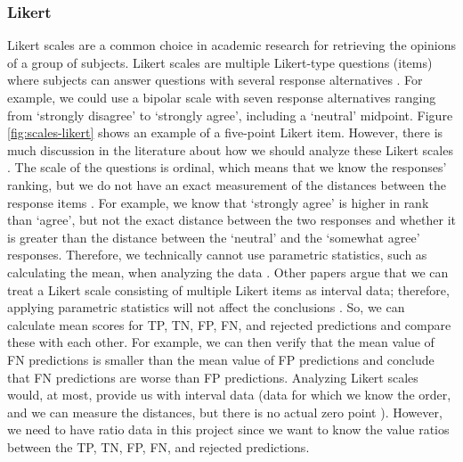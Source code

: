 \subsubsection{Likert}
\label{sec:likert}
Likert scales are a common choice in academic research for retrieving the opinions of a group of subjects.
%
Likert scales are multiple Likert-type questions (items) where subjects can answer questions with several response alternatives \citep{boone2012analyzing}.
%
For example, we could use a bipolar scale with seven response alternatives ranging from `strongly disagree' to `strongly agree', including a `neutral' midpoint.
%
Figure \ref{fig:scales-likert} shows an example of a five-point Likert item.
%
However, there is much discussion in the literature about how we should analyze these Likert scales \citep{boone2012analyzing, allen2007likert, norman2010likert, murray2013likert}.
%
The scale of the questions is ordinal, which means that we know the responses' ranking, but we do not have an exact measurement of the distances between the response items \citep{allen2007likert}.
%
For example, we know that `strongly agree' is higher in rank than `agree', but not the exact distance between the two responses and whether it is greater than the distance between the `neutral' and the `somewhat agree' responses.
%
Therefore, we technically cannot use parametric statistics, such as calculating the mean, when analyzing the data \citep{allen2007likert}.
%
Other papers argue that we can treat a Likert scale consisting of multiple Likert items as interval data; therefore, applying parametric statistics will not affect the conclusions \citep{boone2012analyzing, norman2010likert, murray2013likert}.
%
So, we can calculate mean scores for TP, TN, FP, FN, and rejected predictions and compare these with each other.
%
For example, we can then verify that the mean value of FN predictions is smaller than the mean value of FP predictions and conclude that FN predictions are worse than FP predictions.
%
Analyzing Likert scales would, at most, provide us with interval data (data for which we know the order, and we can measure the distances, but there is no actual zero point \citep{allen2007likert}).
%
However, we need to have ratio data in this project since we want to know the value ratios between the TP, TN, FP, FN, and rejected predictions.

